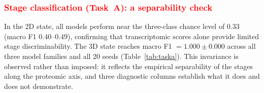 \documentclass[5p,times,twocolumn]{elsarticle}
\newcommand{\rtag}[1]{}
\newcommand{\rev}[2]{\rtag{#1}\textcolor{red}{#2}}
\begin{document}
\subsubsection{\rev{R2.23}{Stage classification (Task~A): a
    separability check}}
\label{sec:res_taska}

In the 2D state, all models perform near the three-class chance
level of 0.33 (macro F1 $0.40$--$0.49$), confirming that
transcriptomic scores alone provide limited stage
discriminability.
The 3D state reaches macro F1 $= 1.000 \pm 0.000$ across all
three model families and all 20 seeds (Table~\ref{tab:taska}).
This invariance is observed rather than imposed: it reflects the
empirical separability of the stages along the proteomic axis,
and three diagnostic columns establish what it does and does not
demonstrate.
\end{document}
